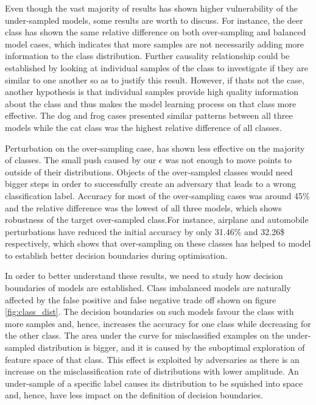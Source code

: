 Even though the vast majority of results has shown higher vulnerability of the under-sampled models, some results are worth to discuss. For instance, the deer class has shown the same relative difference on both over-sampling and balanced model cases, which indicates that more samples are not necessarily adding more information to the class distribution. Further causality relationship could be established by looking at individual samples of the class to investigate if they are similar to one another so as to justify this result. However, if thats not the case, another hypothesis is that individual samples provide high quality information about the class and thus makes the model learning process on that class more effective. The dog and frog cases presented similar patterns between all three models while the cat class was the highest relative difference of all classes. 

Perturbation on the over-sampling case, has shown less effective on the majority of classes. The small push caused by our $\epsilon$ was not enough to move points to outside of their distributions. Objects of the over-sampled classes would need bigger steps in order to successfully create an adversary that leads to a wrong classification label. Accuracy for
most of the over-sampling cases was around 45\% and the relative difference was the lowest of all three models, which shows robustness of the target over-sampled class.For instance, airplane and automobile perturbations have reduced the initial accuracy by only 31.46\% and 32.26\$ respectively, which shows that over-sampling on these classes has helped to model to establish better decision boundaries during optimisation.

In order to better understand these results, we need to study how decision boundaries of models are established. Class imbalanced models are naturally affected by the false positive and false negative trade off shown on figure \ref{fig:class_dist}. The decision boundaries on such models favour the class with more samples and, hence, increases the accuracy for one class while decreasing for the other class. The area under the curve for misclassified examples on the under-sampled distribution is bigger, and it is caused by the suboptimal exploration of feature space of that class. This effect is exploited by adversaries as there is an increase on the misclassification rate of distributions with lower amplitude. An under-sample of a specific label causes its distribution to be squished into space and, hence, have less impact on the definition of decision boundaries.


